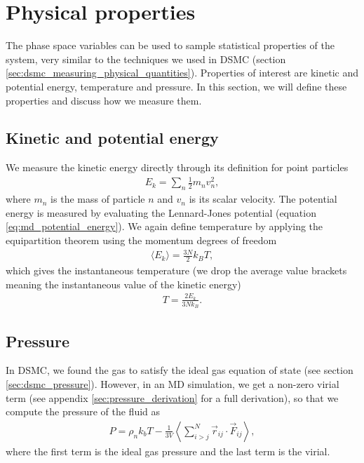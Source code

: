\section{Physical properties}
The phase space variables can be used to sample statistical properties of the system, very similar to the techniques we used in DSMC (section \ref{sec:dsmc_measuring_physical_quantities}). Properties of interest are kinetic and potential energy, temperature and pressure. In this section, we will define these properties and discuss how we measure them.
\subsection{Kinetic and potential energy}
We measure the kinetic energy directly through its definition for point particles
\begin{align}
	E_k = \sum_n \frac{1}{2} m_nv_n^2,
\end{align}
where $m_n$ is the mass of particle $n$ and $v_n$ is its scalar velocity. The potential energy is measured by evaluating the Lennard-Jones potential (equation \eqref{eq:md_potential_energy}). We again define temperature by applying the equipartition theorem using the momentum degrees of freedom
\begin{align*}
	\langle E_k \rangle = \frac{3N}{2}k_BT,
\end{align*}
which gives the instantaneous temperature (we drop the average value brackets meaning the instantaneous value of the kinetic energy)
\begin{align}
	T = \frac{2E_k}{3Nk_B}.
\end{align}
\subsection{Pressure}
In DSMC, we found the gas to satisfy the ideal gas equation of state (see section \ref{sec:dsmc_pressure}). However, in an MD simulation, we get a non-zero virial term (see appendix \ref{sec:pressure_derivation} for a full derivation), so that we compute the pressure of the fluid as
\begin{align}
	P = \rho_n k_bT - \frac{1}{3V}\left\langle \sum_{i>j}^N \vec r_{ij} \cdot \vec F_{ij}\right\rangle,
\end{align}
where the first term is the ideal gas pressure and the last term is the virial. 